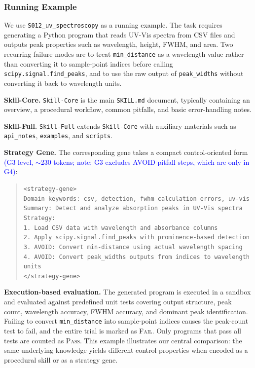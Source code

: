 \documentclass{article}
\newcommand{\blue}[1]{\textcolor{blue}{#1}}
\newcommand{\nbf}[1]{{\noindent \textbf{#1}}}
\begin{document}
\subsubsection{Running Example}

We use \texttt{S012\_uv\_spectroscopy} as a running example. 
The task requires generating a Python program that reads UV-Vis spectra from CSV files and outputs peak properties such as wavelength, height, FWHM, and area. 
Two recurring failure modes are to treat \texttt{min\_distance} as a wavelength value rather than converting it to sample-point indices before calling \texttt{scipy.signal.find\_peaks}, and to use the raw output of \texttt{peak\_widths} without converting it back to wavelength units.

\nbf{Skill-Core.}
\texttt{Skill-Core} is the main \texttt{SKILL.md} document, typically containing an overview, a procedural workflow, common pitfalls, and basic error-handling notes.

\nbf{Skill-Full.}
\texttt{Skill-Full} extends \texttt{Skill-Core} with auxiliary materials such as \texttt{api\_notes}, \texttt{examples}, and \texttt{scripts}.

\nbf{Strategy Gene.}
The corresponding gene takes a compact control-oriented form \blue{(G3 level, $\sim$230 tokens; note: G3 excludes AVOID pitfall steps, which are only in G4)}:
\begin{quote}
\small
\texttt{<strategy-gene>} \\
\texttt{Domain keywords: csv, detection, fwhm calculation errors, uv-vis} \\
\texttt{Summary: Detect and analyze absorption peaks in UV-Vis spectra} \\
\texttt{Strategy:} \\
\texttt{1. Load CSV data with wavelength and absorbance columns} \\
\texttt{2. Apply \texttt{scipy.signal.find\_peaks} with prominence-based detection} \\
\texttt{3. AVOID: Convert min-distance using actual wavelength spacing} \\
\texttt{4. AVOID: Convert \texttt{peak\_widths} outputs from indices to wavelength units} \\
\texttt{</strategy-gene>}
\end{quote}

\nbf{Execution-based evaluation.}
The generated program is executed in a sandbox and evaluated against predefined unit tests covering output structure, peak count, wavelength accuracy, FWHM accuracy, and dominant peak identification. 
Failing to convert \texttt{min\_distance} into sample-point indices causes the peak-count test to fail, and the entire trial is marked as \textsc{Fail}. 
Only programs that pass all tests are counted as \textsc{Pass}. 
This example illustrates our central comparison: the same underlying knowledge yields different control properties when encoded as a procedural skill or as a strategy gene.
\end{document}
